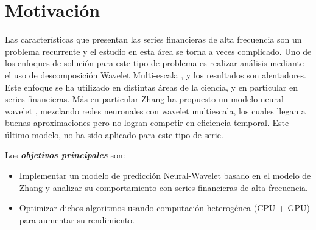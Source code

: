 %

\section{Motivación}

Las características que presentan las series financieras de alta frecuencia son un problema recurrente y el estudio en esta área se torna a veces complicado.
Uno de los enfoques de solución para este tipo de problema es realizar análisis mediante el uso de descomposición Wavelet Multi-escala \cite{benaouda2006wavelet}, y 
los resultados son alentadores. Este enfoque se ha utilizado en distintas áreas de la ciencia, y en particular en series financieras. Más en particular Zhang ha propuesto 
un modelo neural-wavelet \cite{zhang2001adaptive}, mezclando redes neuronales con wavelet multiescala, los cuales llegan a buenas aproximaciones pero no logran competir 
en eficiencia temporal. Este último modelo, no ha sido aplicado para este tipo de serie.


Los \emph{\textbf{objetivos principales}} son:
\begin{itemize}
	\item Implementar un modelo de predicción Neural-Wavelet basado en el modelo de Zhang y analizar su comportamiento con series
		financieras de alta frecuencia.
	\item Optimizar dichos algoritmos usando computación heterogénea (CPU + GPU) para aumentar su rendimiento.
\end{itemize} 

